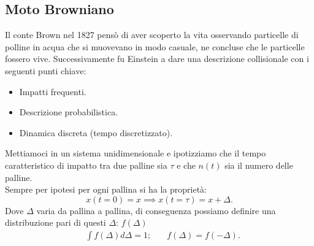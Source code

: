 \subsection{Moto Browniano}%
Il conte Brown nel 1827 pensò di aver scoperto la vita osservando particelle di polline in acqua che si muovevano in modo casuale, ne concluse che le particelle fossero vive. Successivamente fu Einstein a dare una descrizione collisionale con i seguenti punti chiave:
\begin{itemize}
    \item Impatti frequenti.
    \item Descrizione probabilistica.
    \item Dinamica discreta (tempo discretizzato).
\end{itemize}
Mettiamoci in un sistema unidimensionale e ipotizziamo che il tempo caratteristico di impatto tra due palline sia $\tau$ e che $n(t)$ sia il numero delle palline.\\
Sempre per ipotesi per ogni pallina si ha la proprietà:
\[
    x(t=0) = x \implies  x(t=\tau) = x + \Delta
.\] 
Dove $\Delta$ varia da pallina a pallina, di conseguenza possiamo definire una distribuzione pari di questi $\Delta$: $f(\Delta)$
\[\begin{aligned}
    &\int f(\Delta) d\Delta = 1; \quad &f(\Delta) = f(-\Delta) 
.\end{aligned}\]
